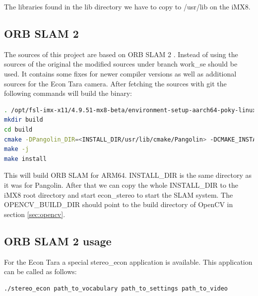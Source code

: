 \documentclass[11pt,a4paper,titlepage,oneside]{report}
\begin{document}
The libraries found in the lib directory we have to copy to /usr/lib on the iMX8.

\subsection{ORB SLAM 2}
The sources of this project are based on ORB SLAM 2 \cite{orbslam2_impl}. Instead of using the sources of the original the modified sources \cite{orbslam2_se} under branch work\_se should be used. It contains some fixes for newer compiler versions as well as additional sources for the Econ Tara camera. After fetching the sources with git the following commands will build the binary:\\
\begin{lstlisting}[language=bash]
. /opt/fsl-imx-x11/4.9.51-mx8-beta/environment-setup-aarch64-poky-linux
mkdir build
cd build
cmake -DPangolin_DIR=<INSTALL_DIR/usr/lib/cmake/Pangolin> -DCMAKE_INSTALL_PREFIX=<INSTALL_DIR> -DOpenCV_DIR:PATH=<OPENCV_BUILD_DIR> ..
make -j
make install
\end{lstlisting}

This will build ORB SLAM for ARM64. INSTALL\_DIR is the same directory as it was for Pangolin. After that we can copy the whole INSTALL\_DIR to the iMX8 root directory and start econ\_stereo to start the SLAM system. The OPENCV\_BUILD\_DIR should point to the build directory of OpenCV in section \ref{sec:opencv}.

\subsection{ORB SLAM 2 usage}

For the Econ Tara a special stereo\_econ application is available. This application can be called as follows:
\begin{lstlisting}[language=bash]
./stereo_econ path_to_vocabulary path_to_settings path_to_video
\end{lstlisting}
\end{document}
